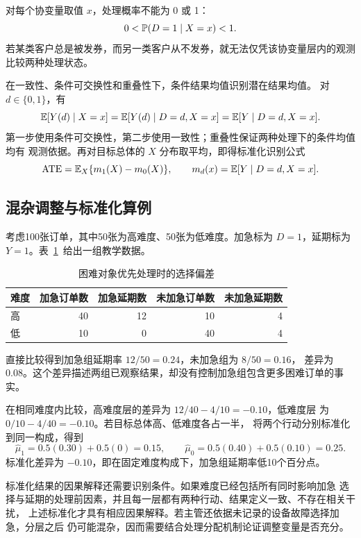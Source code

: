 \begin{definition}[重叠性]
对每个协变量取值 \(x\)，处理概率不能为 0 或 1：
\[
  0<\mathbb P(D=1\mid X=x)<1.
\]
若某类客户总是被发券，而另一类客户从不发券，就无法仅凭该协变量层内的观测比较两种处理状态。
\end{definition}

在一致性、条件可交换性和重叠性下，条件结果均值识别潜在结果均值。
对 \(d\in\{0,1\}\)，有
\[
\mathbb E[Y(d)\mid X=x]
=\mathbb E[Y(d)\mid D=d,X=x]
=\mathbb E[Y\mid D=d,X=x].
\]
第一步使用条件可交换性，第二步使用一致性；重叠性保证两种处理下的条件均值均有
观测依据。再对目标总体的 \(X\) 分布取平均，即得标准化识别公式
\[
\operatorname{ATE}
=\mathbb E_X\{m_1(X)-m_0(X)\},\qquad
m_d(x)=\mathbb E[Y\mid D=d,X=x].
\]

\subsection{混杂调整与标准化算例}
\label{sec:causal-standardization}
考虑100张订单，其中50张为高难度、50张为低难度。加急标为 \(D=1\)，延期标为
\(Y=1\)。表~\ref{tab:causal-example}~给出一组教学数据。
\begin{table}[htbp]
\centering
\caption{困难对象优先处理时的选择偏差}
\label{tab:causal-example}
\begin{tabular}{lrrrr}
\toprule
\rowcolor{BDMTableHead}
难度 & 加急订单数 & 加急延期数 & 未加急订单数 & 未加急延期数\\
\midrule
高 & 40 & 12 & 10 & 4\\
低 & 10 & 0 & 40 & 4\\
\bottomrule
\end{tabular}
\end{table}

直接比较得到加急组延期率 \(12/50=0.24\)，未加急组为 \(8/50=0.16\)，
差异为0.08。这个差异描述两组已观察结果，却没有控制加急组包含更多困难订单的事实。

在相同难度内比较，高难度层的差异为 \(12/40-4/10=-0.10\)，低难度层
为 \(0/10-4/40=-0.10\)。若目标总体高、低难度各占一半，
将两个行动分别标准化到同一构成，得到
\[
\widehat\mu_1=0.5(0.30)+0.5(0)=0.15,\qquad
\widehat\mu_0=0.5(0.40)+0.5(0.10)=0.25.
\]
标准化差异为 \(-0.10\)，即在固定难度构成下，加急组延期率低10个百分点。

标准化结果的因果解释还需要识别条件。如果难度已经包括所有同时影响加急
选择与延期的处理前因素，并且每一层都有两种行动、结果定义一致、不存在相关干扰，
上述标准化才具有相应因果解释。若主管还依据未记录的设备故障选择加急，分层之后
仍可能混杂，因而需要结合处理分配机制论证调整变量是否充分。

